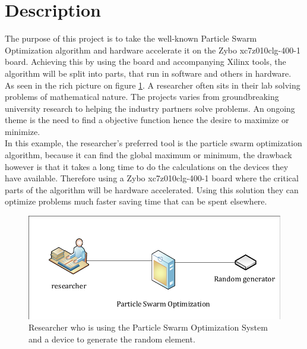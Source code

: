 \section{Description}\label{sc:problemdescription}
The purpose of this project is to take the well-known Particle Swarm Optimization algorithm and hardware accelerate it on the Zybo xc7z010clg-400-1 board. Achieving this by using the board and accompanying Xilinx tools, the algorithm will be split into parts, that run in software and others in hardware.\\

As seen in the rich picture on figure \ref{fig:descriptiondiagram}. A researcher often sits in their lab solving problems of mathematical nature. The projects varies from groundbreaking university research to helping the industry partners solve problems. An ongoing theme is the need to find a objective function hence the desire to maximize or minimize.\\

In this example, the researcher's preferred tool is the particle swarm optimization algorithm, because it can find the global maximum or minimum, the drawback however is that it takes a long time to do the calculations on the devices they have available. Therefore using a Zybo xc7z010clg-400-1 board where the critical parts of the algorithm will be hardware accelerated. Using this solution they can optimize problems much faster saving time that can be spent elsewhere.

\begin{figure}[H]
	\centering
	\includegraphics[width=0.7\linewidth]{diagram/description_diagram}
	\caption{Researcher who is using the Particle Swarm Optimization System and a device to generate the random element.}
	\label{fig:descriptiondiagram}
\end{figure}